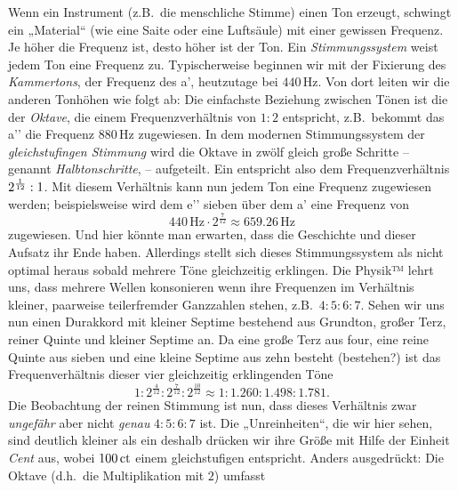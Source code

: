 \documentclass[british,11pt]{scrartcl}
\begin{document}
Wenn ein Instrument (z.B.\ die menschliche Stimme) einen Ton erzeugt, schwingt
ein „Material“ (wie eine Saite oder eine Luftsäule) mit einer gewissen Frequenz.
Je höher die Frequenz ist, desto höher ist der Ton. Ein \emph{Stimmungssystem}
weist jedem Ton eine Frequenz zu. Typischerweise beginnen wir mit der Fixierung
des \emph{Kammertons}, der Frequenz des a’, heutzutage bei $440$\,Hz. Von dort
leiten wir die anderen Tonhöhen wie folgt ab: Die einfachste Beziehung zwischen
Tönen ist die der \emph{Oktave}, die einem Frequenzverhältnis von $1:2$
entspricht, z.B.\ bekommt das a’’ die Frequenz $880$\,Hz zugewiesen. In dem
modernen Stimmungssystem der \emph{gleichstufingen Stimmung} wird die Oktave in
zwölf gleich große Schritte – genannt \emph{Halbtonschritte},  – 
aufgeteilt. Ein  entspricht also dem Frequenzverhältnis
$2^{\smash{\frac1{12}}}:1$. Mit diesem Verhältnis kann nun jedem Ton eine
Frequenz zugewiesen werden; beispielsweise wird dem e’’ sieben 
über dem a’ eine Frequenz von 
\[440\,\text{Hz}\cdot 2^{\frac7{12}} \approx 659.26\,\text{Hz}\] zugewiesen. Und
hier könnte man erwarten, dass die Geschichte und dieser Aufsatz ihr Ende
haben. Allerdings stellt sich dieses Stimmungssystem als nicht optimal heraus
sobald mehrere Töne gleichzeitig erklingen. Die Physik™ lehrt uns, dass mehrere
Wellen konsonieren wenn ihre Frequenzen im Verhältnis kleiner, paarweise
teilerfremder Ganzzahlen stehen, z.B.\ $4:5:6:7$. Sehen wir uns nun einen
Durakkord mit kleiner Septime bestehend aus Grundton, großer Terz, reiner Quinte
und kleiner Septime an. Da eine große Terz aus four, eine reine Quinte aus
sieben und eine kleine Septime aus zehn  besteht (bestehen?)
ist das Frequenverhältnis dieser vier gleichzeitig erklingenden Töne
\[1:2^{\frac4{12}}:2^{\frac7{12}}:2^{\frac{10}{12}}\approx
1:1.260:1.498:1.781.\]%
Die Beobachtung der reinen Stimmung ist nun, dass dieses Verhältnis zwar
\emph{ungefähr} aber nicht \emph{genau} $4:5:6:7$ ist.
Die „Unreinheiten“, die wir hier sehen, sind deutlich kleiner als ein
 deshalb drücken wir ihre Größe mit Hilfe der Einheit \emph{Cent} aus,
wobei $100\,\mathrm{ct}$ einem gleichstufigen  entspricht. Anders
ausgedrückt: Die Oktave (d.h.\ die Multiplikation mit $2$) umfasst
\end{document}
